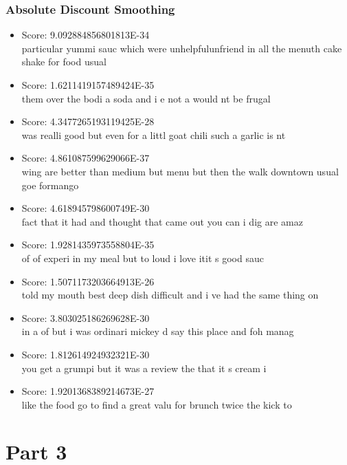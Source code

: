 \documentclass[paper=a4, fontsize=11pt]{jhwhw} %
\begin{document}
\subsubsection{Absolute Discount Smoothing}
\begin{itemize}
\item Score: 9.092884856801813E-34\\
particular yummi sauc which were unhelpfulunfriend in all the menuth cake shake for food usual 
\item Score: 1.6211419157489424E-35\\ 
them over the bodi a soda and i e not a would nt be frugal 
\item Score: 4.3477265193119425E-28 \\
was realli good but even for a littl goat chili such a garlic is nt 
\item Score: 4.861087599629066E-37 \\
wing are better than medium but menu but then the walk downtown usual goe formango 
\item Score: 4.618945798600749E-30 \\
fact that it had and thought that came out you can i dig are amaz 
\item Score: 1.9281435973558804E-35 \\
of of experi in my meal but to loud i love itit s good sauc 
\item Score: 1.5071173203664913E-26\\
told my mouth best deep dish difficult and i ve had the same thing on  
\item Score: 3.803025186269628E-30 \\
in a of but i was ordinari mickey d say this place and foh manag 
\item Score: 1.812614924932321E-30 \\
you get a grumpi but it was a review the that it s cream i 
\item Score: 1.9201368389214673E-27  \\
like the food go to find a great valu for brunch twice the kick to 
\end{itemize}

\section{Part 3}
\end{document}
